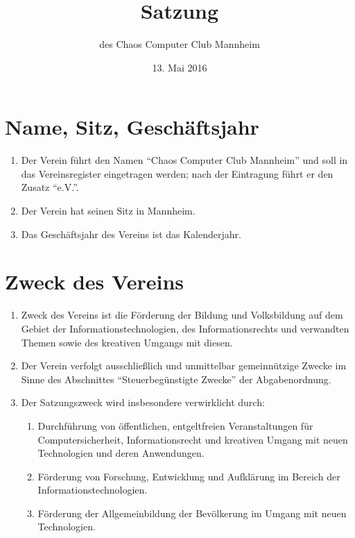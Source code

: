 \documentclass[a4paper, 12pt]{scrartcl}
\title{Satzung}
\subtitle{des Chaos Computer Club Mannheim}
\author{}
\date{13. Mai 2016}
\begin{document}
\maketitle
\sffamily
\tableofcontents

\newpage
\section{Name, Sitz, Geschäftsjahr}
\begin{enumerate}
	\item Der Verein führt den Namen "`Chaos Computer Club Mannheim"' und soll in das Vereinsregister eingetragen werden; nach der Eintragung führt er den Zusatz "`e.V."'.
	\item Der Verein hat seinen Sitz in Mannheim.
	\item Das Geschäftsjahr des Vereins ist das Kalenderjahr.
\end{enumerate}

\section{Zweck des Vereins}
\begin{enumerate}
	\item Zweck des Vereins ist die Förderung der Bildung und Volksbildung auf dem Gebiet der Informationstechnologien, des Informationsrechts und verwandten Themen sowie des kreativen Umgangs mit diesen.
	\item Der Verein verfolgt ausschließlich und unmittelbar gemeinnützige Zwecke im Sinne des Abschnittes "`Steuerbegünstigte Zwecke"' der Abgabenordnung.
	\item Der Satzungszweck wird insbesondere verwirklicht durch:
	\begin{enumerate}
		\item Durchführung von öffentlichen, entgeltfreien Veranstaltungen für Computersicherheit, Informationsrecht und kreativen Umgang mit neuen Technologien und deren Anwendungen.
		\item Förderung von Forschung, Entwicklung und Aufklärung im Bereich der Informationstechnologien.
		\item Förderung der Allgemeinbildung der Bevölkerung im Umgang mit neuen Technologien.
	\end{enumerate}
\end{enumerate}
\end{document}
